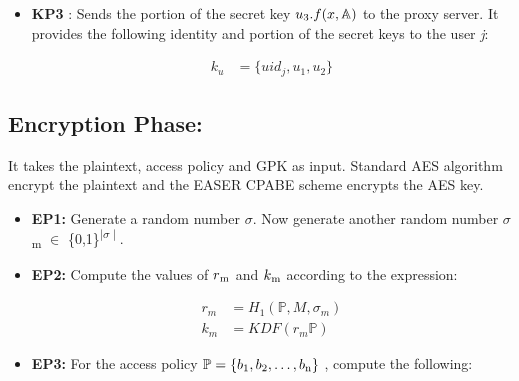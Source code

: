 \documentclass[conference]{IEEEtran}
\begin{document}
{\begin{itemize}
\item{\textbf {KP3}} : Sends the portion of the secret key $u\textsubscript{3} .  f(x, \mathbb{A} )$ to the proxy server.
It provides the following identity and portion of the secret keys to the user \emph{j}:

\begin{ceqn}
    \begin{align}
        k_u &= \{uid_j, u_1, u_2\}
    \end{align}
\end{ceqn}

\end{itemize}


\subsection{\textbf {Encryption Phase: }}
It takes the plaintext, access policy and GPK as input. Standard AES algorithm encrypt the plaintext and the EASER CPABE scheme encrypts the AES key.

\begin{itemize}
    
\item{\textbf {EP1:}} Generate a random number $\sigma$. Now generate another random number $\sigma$\textsubscript{m} $\in$ \{0,1\}\textsuperscript{$\mid\sigma\mid$}. 

{\color{red}{What is the difference between the two?}}

\item{\textbf{EP2:}} Compute the values of $r\textsubscript{m}$ and $k\textsubscript{m}$ according to the expression: 
\begin{ceqn}
    \begin{align}
        r_m &= H_1(\mathbb{P}, M, \sigma_m )\\
        k_m &= KDF(r_m\mathbb{P} )
    \end{align}
\end{ceqn}

\item{\textbf {EP3:}} For the access policy $\mathbb{P} = \{b\textsubscript{1}, b\textsubscript{2}, \ldots, b\textsubscript{n}\}$ , compute the following:


\end{itemize}}
\end{document}
